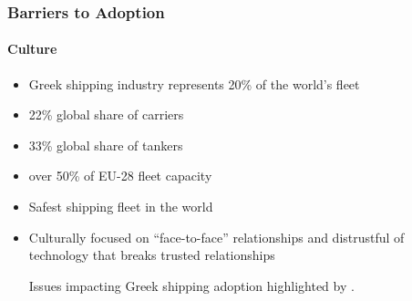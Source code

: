 \begin{frame}
  \frametitle{Barriers to Adoption}
  \framesubtitle{Culture}
  \begin{itemize}
    \item Greek shipping industry represents 20\% of the world's fleet
    \item 22\% global share of carriers
    \item 33\% global share of tankers
    \item over 50\% of EU-28 fleet capacity
    \item Safest shipping fleet in the world
    \item Culturally focused on ``face-to-face'' relationships and distrustful of technology that breaks trusted relationships

           {\scriptsize{Issues impacting Greek shipping adoption highlighted by \textcite{papathanasiouNonApplicationBlockchain2020}.}}

  \end{itemize}
\end{frame}
